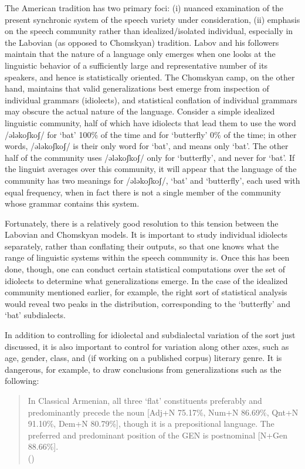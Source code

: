 \documentclass[output=paper]{langscibook}
\begin{document}
The American tradition has two primary foci: (i) nuanced examination of the present synchronic system of the speech variety under consideration, (ii) emphasis on the speech community rather than idealized/isolated individual, especially in the Labovian (as opposed to Chomskyan) tradition. Labov and his followers maintain that the nature of a language only emerges when one looks at the linguistic behavior of a sufficiently large and representative number of its speakers, and hence is statistically oriented. The Chomskyan camp, on the other hand, maintains that valid generalizations best emerge from inspection of individual grammars (idiolects), and statistical conflation of individual grammars may obscure the actual nature of the language. Consider a simple idealized linguistic community, half of which have idiolects that lead them to use the word /ələkoʃkoʃ/ for `bat' 100\% of the time and for `butterfly' 0\% of the time; in other words, /ələkoʃkoʃ/ is their only word for `bat', and means only `bat'.  The other half of the community uses /ələkoʃkoʃ/ only for `butterfly',  and never for `bat'.  If the linguist averages over this community, it will appear that the language of the community has two meanings for /ələkoʃkoʃ/, `bat' and `butterfly', each used with equal frequency, when in fact there is not a single member of the community whose grammar contains this system.

Fortunately, there is a relatively good resolution to this tension between the Labovian and Chomskyan models. It is important to study individual idiolects separately, rather than conflating their outputs, so that one knows what the range of linguistic systems within the speech community is. Once this has been done, though, one can conduct certain statistical computations over the set of idiolects to determine what generalizations emerge. In the case of the idealized community mentioned earlier, for example, the right sort of statistical analysis would reveal two peaks in the distribution, corresponding to the `butterfly' and `bat' subdialects.

In addition to controlling for idiolectal and subdialectal variation of the sort just discussed, it is also important to control for variation along other axes, such as age, gender, class, and (if working on a published corpus) literary genre. It is dangerous, for example, to draw conclusions from generalizations such as the following:

\begin{quote}
     In Classical Armenian, all three `flat' constituents preferably and predominantly precede the noun [Adj+N 75.17\%, Num+N 86.69\%, Qnt+N 91.10\%, Dem+N 80.79\%], though it is a prepositional language. The preferred and predominant position of the GEN is postnominal [N+Gen 88.66\%].\\
     \hfill\hbox{(\citealt[292]{DumTragut-2002-WordOrderArmenian})}
\end{quote} 
\end{document}
